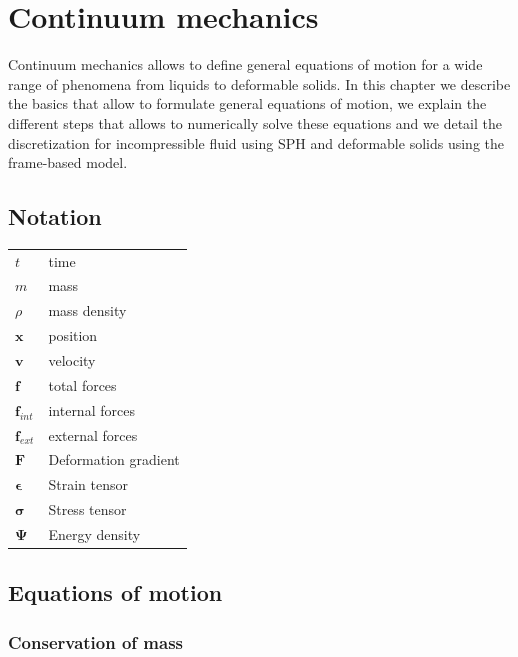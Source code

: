 \section{Continuum mechanics}

Continuum mechanics allows to define general equations of motion for a wide range of phenomena from liquids to deformable solids. In this chapter we describe the basics that allow to formulate general equations of motion, we explain the different steps that allows to numerically solve these equations and we detail the discretization for incompressible fluid using SPH and deformable solids using the frame-based model.

\subsection{Notation}

\begin{table}[!h]
\begin{tabular}{ll}
$t$ & time \\
$m$ &  mass \\
$\rho$ & mass density \\
$\mathbf{x}$ & position \\
$\mathbf{v}$ & velocity \\
$\mathbf{f}$ & total forces \\
$\mathbf{f}_{int}$ & internal forces \\
$\mathbf{f}_{ext}$ & external forces \\
$\mathbf{F}$ & Deformation gradient \\
$\mathbf{\epsilon}$ & Strain tensor \\
$\mathbf{\sigma}$ & Stress tensor \\
$\mathbf{\Psi}$ & Energy density
\end{tabular}
\end{table}

\subsection{Equations of motion}

\subsubsection{Conservation of mass}

